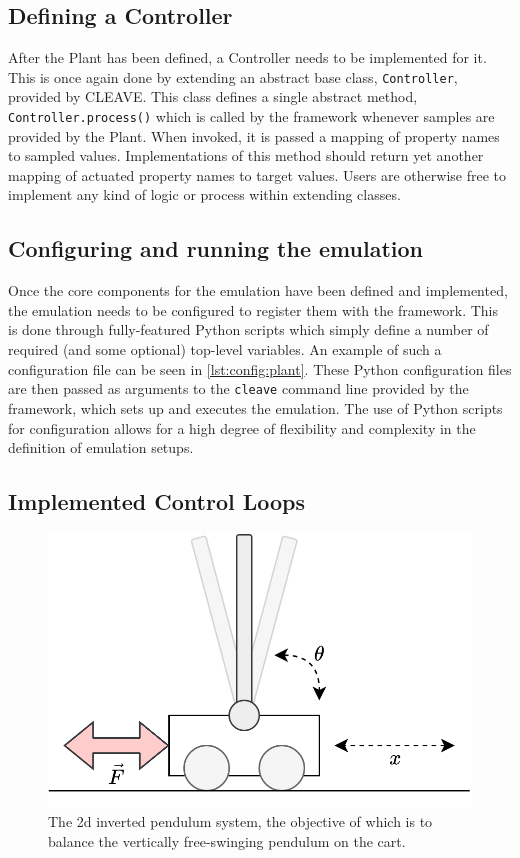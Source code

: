 \subsection{Defining a Controller}

After the Plant has been defined, a Controller needs to be implemented for it.
This is once again done by extending an abstract base class, \texttt{Controller}, provided by CLEAVE.\@
This class defines a single abstract method, \texttt{Controller.process()} which is called by the framework whenever samples are provided by the Plant.
When invoked, it is passed a mapping of property names to sampled values.
Implementations of this method should return yet another mapping of actuated property names to target values.
Users are otherwise free to implement any kind of logic or process within extending classes.

\subsection{Configuring and running the emulation}

Once the core components for the emulation have been defined and implemented, the emulation needs to be configured to register them with the framework.
This is done through fully-featured Python scripts which simply define a number of required (and some optional) top-level variables.
An example of such a configuration file can be seen in \cref{lst:config:plant}.
These Python configuration files are then passed as arguments to the \texttt{cleave} command line provided by the framework, which sets up and executes the emulation.
The use of Python scripts for configuration allows for a high degree of flexibility and complexity in the definition of emulation setups.

\subsection{Implemented Control Loops}

\begin{figure}
    \centering
    \includegraphics[width=.7\columnwidth]{images/inverted_pendulum.png}
    \caption{
        The 2d inverted pendulum system, the objective of which is to balance the vertically free-swinging pendulum on the cart.
    }\label{fig:invpend}
\end{figure}

